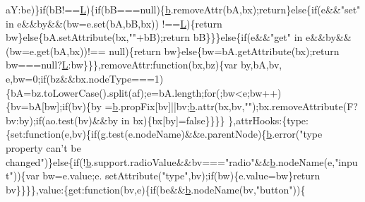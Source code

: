 \begin{DoxyCode}
      aY:be)\}\textcolor{keywordflow}{if}(bB!==\hyperlink{docs_2_programmer's_manual_2html_2jquery_8js_a38ee4c0b5f4fe2a18d0c783af540d253}{L})\{\textcolor{keywordflow}{if}(bB===null)\{\hyperlink{docs_2_programmer's_manual_2html_2jquery_8js_aa4026ad5544b958e54ce5e106fa1c805}{b}.removeAttr(bA,bx);\textcolor{keywordflow}{return}\}\textcolor{keywordflow}{else}\{\textcolor{keywordflow}{if}(e&&\textcolor{stringliteral}{"set"} in e&&by&&(bw=e.set(bA,bB,bx))
      !==\hyperlink{docs_2_programmer's_manual_2html_2jquery_8js_a38ee4c0b5f4fe2a18d0c783af540d253}{L})\{\textcolor{keywordflow}{return} bw\}\textcolor{keywordflow}{else}\{bA.setAttribute(bx,\textcolor{stringliteral}{""}+bB);\textcolor{keywordflow}{return} bB\}\}\}\textcolor{keywordflow}{else}\{\textcolor{keywordflow}{if}(e&&\textcolor{stringliteral}{"get"} in e&&by&&(bw=e.get(bA,bx))!==
      null)\{\textcolor{keywordflow}{return} bw\}\textcolor{keywordflow}{else}\{bw=bA.getAttribute(bx);\textcolor{keywordflow}{return} bw===null?\hyperlink{docs_2_programmer's_manual_2html_2jquery_8js_a38ee4c0b5f4fe2a18d0c783af540d253}{L}:bw\}\}\},removeAttr:\textcolor{keyword}{function}(bx,bz)\{var by,bA,bv,
      e,bw=0;\textcolor{keywordflow}{if}(bz&&bx.nodeType===1)\{bA=bz.toLowerCase().split(af);e=bA.length;\textcolor{keywordflow}{for}(;bw<e;bw++)\{bv=bA[bw];\textcolor{keywordflow}{if}(bv)\{by
      =\hyperlink{docs_2_programmer's_manual_2html_2jquery_8js_aa4026ad5544b958e54ce5e106fa1c805}{b}.propFix[bv]||bv;\hyperlink{docs_2_programmer's_manual_2html_2jquery_8js_aa4026ad5544b958e54ce5e106fa1c805}{b}.attr(bx,bv,\textcolor{stringliteral}{""});bx.removeAttribute(F?bv:by);\textcolor{keywordflow}{if}(ao.test(bv)&&by in bx)\{bx[by]=\textcolor{keyword}{false}\}\}\}\}
      \},attrHooks:\{type:\{set:\textcolor{keyword}{function}(e,bv)\{\textcolor{keywordflow}{if}(g.test(e.nodeName)&&e.parentNode)\{\hyperlink{docs_2_programmer's_manual_2html_2jquery_8js_aa4026ad5544b958e54ce5e106fa1c805}{b}.error(\textcolor{stringliteral}{"type property can't be
       changed"})\}\textcolor{keywordflow}{else}\{\textcolor{keywordflow}{if}(!\hyperlink{docs_2_programmer's_manual_2html_2jquery_8js_aa4026ad5544b958e54ce5e106fa1c805}{b}.support.radioValue&&bv===\textcolor{stringliteral}{"radio"}&&\hyperlink{docs_2_programmer's_manual_2html_2jquery_8js_aa4026ad5544b958e54ce5e106fa1c805}{b}.nodeName(e,\textcolor{stringliteral}{"input"}))\{var bw=e.value;e.
      setAttribute(\textcolor{stringliteral}{"type"},bv);\textcolor{keywordflow}{if}(bw)\{e.value=bw\}\textcolor{keywordflow}{return} bv\}\}\}\},value:\{\textcolor{keyword}{get}:\textcolor{keyword}{function}(bv,e)\{\textcolor{keywordflow}{if}(be&&\hyperlink{docs_2_programmer's_manual_2html_2jquery_8js_aa4026ad5544b958e54ce5e106fa1c805}{b}.nodeName(bv,\textcolor{stringliteral}{"button"}))\{\textcolor{keywordflow}{
}
\end{DoxyCode}

